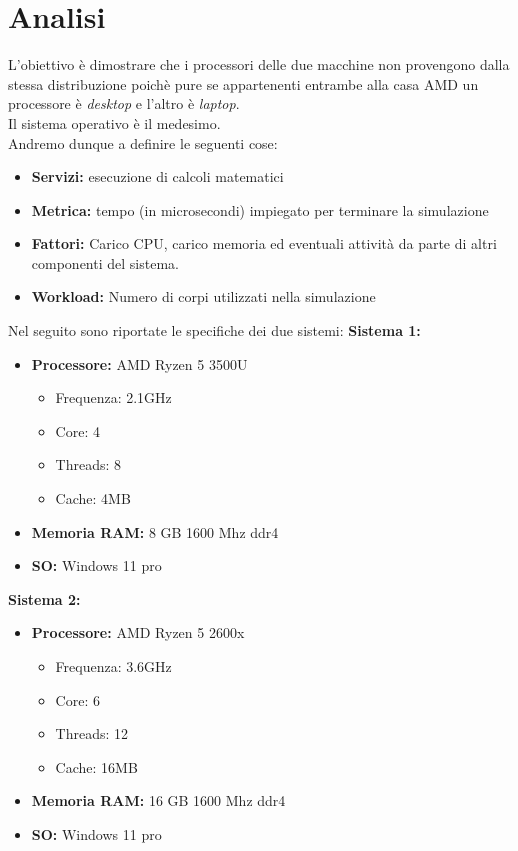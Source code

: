 \section{Analisi}
L'obiettivo è dimostrare che i processori delle due macchine non provengono dalla stessa distribuzione poichè pure se appartenenti entrambe alla casa AMD un processore è \textit{desktop} e l'altro è \textit{laptop}.\\
Il sistema operativo è il medesimo.\\
Andremo dunque a definire le seguenti cose:
\begin{itemize}
    \item \textbf{Servizi:} esecuzione di calcoli matematici 
    \item \textbf{Metrica:} tempo (in microsecondi) impiegato per terminare la simulazione
    \item \textbf{Fattori:} Carico CPU, carico memoria ed eventuali attività da parte di altri componenti del sistema.
    \item \textbf{Workload:} Numero di corpi utilizzati nella simulazione
\end{itemize}
Nel seguito sono riportate le specifiche dei due sistemi:
\textbf{Sistema 1:}
\begin{itemize}
    \item \textbf{Processore: } AMD Ryzen 5 3500U
        \begin{itemize}
            \item Frequenza: 2.1GHz
            \item Core: 4
            \item Threads: 8
            \item Cache: 4MB
        \end{itemize}
    \item \textbf{Memoria RAM: } 8 GB 1600 Mhz ddr4
    \item \textbf{SO:} Windows 11 pro 
\end{itemize}

\textbf{Sistema 2:}
\begin{itemize}
    \item \textbf{Processore: } AMD Ryzen 5 2600x
        \begin{itemize}
            \item Frequenza: 3.6GHz
            \item Core: 6
            \item Threads: 12
            \item Cache: 16MB
        \end{itemize}
    \item \textbf{Memoria RAM: } 16 GB 1600 Mhz ddr4
    \item \textbf{SO:} Windows 11 pro 
\end{itemize}

